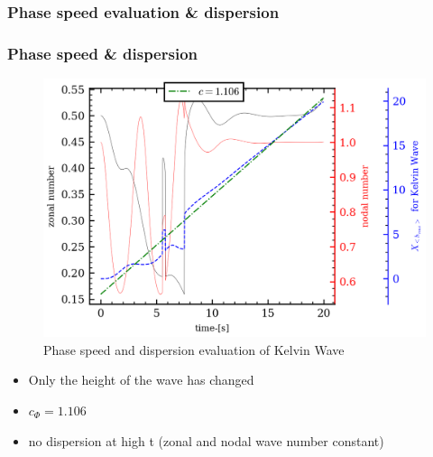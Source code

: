 \documentclass[numbering=fraction]{beamer}
\begin{document}
\subsubsection{Phase speed evaluation \& dispersion}
\begin{frame}
    \frametitle{Phase speed \& dispersion}
    \begin{minipage}{.6\linewidth}

        \begin{figure}[H]
            \includegraphics[width=1\linewidth]{./figure/0velocity_wave_params.png}
            \caption{Phase speed and dispersion evaluation of Kelvin Wave}
        \end{figure}
    \end{minipage}
    \begin{minipage}{.3\linewidth}
        \begin{itemize}
            \item Only the height of the wave has changed
            \item $c_\Phi = 1.106$
            \item no dispersion at high t (zonal and nodal wave number constant)
        \end{itemize}
    \end{minipage}
\end{frame}
\end{document}
